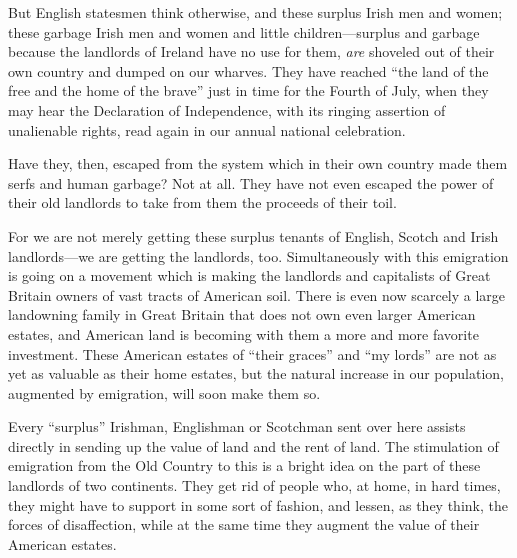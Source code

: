 \documentclass{book}
\begin{document}
But English statesmen think otherwise, and these surplus Irish men and women; these garbage Irish men and women and little children—surplus and garbage because the landlords of Ireland have no use for them, \emph{are} shoveled out of their own country and dumped on our wharves. They have reached “the land of the free and the home of the brave” just in time for the Fourth of July, when they may hear the Declaration of Independence, with its ringing assertion of unalienable rights, read again in our annual national celebration.

Have they, then, escaped from the system which in their own country made them serfs and human garbage? Not at all. They have not even escaped the power of their old landlords to take from them the proceeds of their toil.

For we are not merely getting these surplus tenants of English, Scotch and Irish landlords—we are getting the landlords, too. Simultaneously with this emigration is going on a movement which is making the landlords and capitalists of Great Britain owners of vast tracts of American soil. There is even now scarcely a large landowning family in Great Britain that does not own even larger American estates, and American land is becoming with them a more and more favorite investment. These American estates of “their graces” and “my lords” are not as yet as valuable as their home estates, but the natural increase in our population, augmented by emigration, will soon make them so.

Every “surplus” Irishman, Englishman or Scotchman sent over here assists directly in sending up the value of land and the rent of land. The stimulation of emigration from the Old Country to this is a bright idea on the part of these landlords of two continents. They get rid of people who, at home, in hard times, they might have to support in some sort of fashion, and lessen, as they think, the forces of disaffection, while at the same time they augment the value of their American estates.
\end{document}
